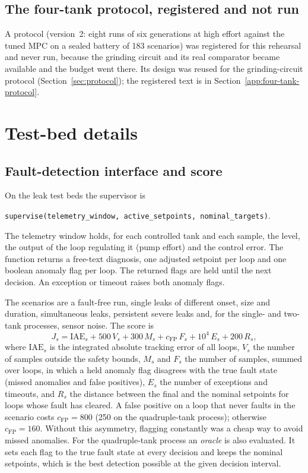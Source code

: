 \subsection{The four-tank protocol, registered and not run}
\label{sec:tank-protocol}
A protocol (version~2: eight runs of six generations at high effort against
the tuned MPC on a sealed battery of 183 scenarios) was registered for this
rehearsal and never run, because the grinding circuit and its real comparator
became available and the budget went there. Its design was reused for the
grinding-circuit protocol (Section~\ref{sec:protocol}); the registered text is
in Section~\ref{app:four-tank-protocol}.

\section{Test-bed details}

\subsection{Fault-detection interface and score}
On the leak test beds the supervisor is
\begin{center}
\texttt{supervise(telemetry\_window, active\_setpoints, nominal\_targets)}.
\end{center}
The telemetry window holds, for each controlled tank
and each sample, the level, the output of the loop regulating it (pump
effort) and the control error. The function returns a free-text diagnosis,
one adjusted setpoint per loop and one boolean anomaly flag per loop. The
returned flags are held until the next decision. An exception or timeout
raises both anomaly flags.

The scenarios are a fault-free run,
single leaks of different onset, size and duration, simultaneous leaks,
persistent severe leaks and, for the single- and two-tank processes, sensor
noise. The score is
\begin{equation}
  J_s = \mathrm{IAE}_s + 500\,V_s + 300\,M_s + c_{\mathrm{FP}}\,F_s
        + 10^4\,E_s + 200\,R_s ,
  \label{eq:score}
\end{equation}
where $\mathrm{IAE}_s$ is the integrated absolute tracking error of all
loops, $V_s$ the number of samples outside the safety bounds, $M_s$ and $F_s$
the number of samples, summed over loops, in which a held anomaly flag
disagrees with the true fault state (missed anomalies and false positives),
$E_s$ the number of exceptions and timeouts, and $R_s$ the distance between
the final and the nominal setpoints for loops whose fault has cleared. A
false positive on a loop that never faults in the scenario costs
$c_{\mathrm{FP}} = 800$ (250 on the quadruple-tank process); otherwise
$c_{\mathrm{FP}} = 160$. Without this asymmetry, flagging constantly was a
cheap way to avoid missed anomalies. For the quadruple-tank process an
\emph{oracle} is also evaluated. It sets each flag to the true fault state at
every decision and keeps the nominal setpoints, which is the best detection
possible at the given decision interval.

